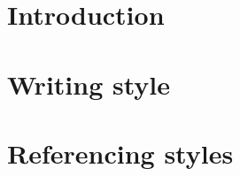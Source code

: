 \documentclass[ieee]{tauthesis}
\begin{document}
\clearpage
{}
\setcounter{page}{0}


\maketitle


\ifdraftmode\else
    \tableofcontents




    \glsaddall
    \setlength{\glsnamewidth}{0.25\textwidth}
    \setlength{\glsdescwidth}{0.75\textwidth}
    \renewcommand*{\glsgroupskip}{}

    \printglossary[title={Glossary}]

\fi



\clearpage
{}
\setcounter{page}{1}


\chapter{Introduction}
\label{ch:introduction}



\chapter{Writing style}
\label{ch:writing style}



\chapter{Referencing styles}
\label{ch:referencing styles}

\end{document}
